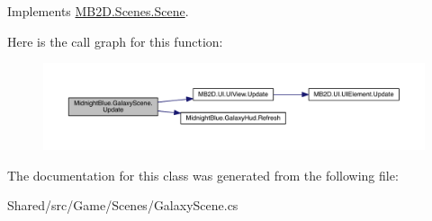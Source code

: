 Implements \hyperlink{class_m_b2_d_1_1_scenes_1_1_scene_a779de7c1ab23b698dcde3a228324a991}{M\+B2\+D.\+Scenes.\+Scene}.

Here is the call graph for this function\+:\nopagebreak
\begin{figure}[H]
\begin{center}
\leavevmode
\includegraphics[width=350pt]{class_midnight_blue_1_1_galaxy_scene_a9dfa66406143ed20f4d534c768f05a78_cgraph}
\end{center}
\end{figure}


The documentation for this class was generated from the following file\+:\begin{DoxyCompactItemize}
\item 
Shared/src/\+Game/\+Scenes/Galaxy\+Scene.\+cs\end{DoxyCompactItemize}
